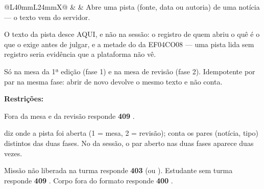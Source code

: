 \begin{tabularx}{\linewidth}{@{}L{40mm}L{24mm}X@{}}
 &  & Abre uma pista (fonte, data ou autoria) de uma notícia --- o texto vem do servidor.\par O texto da pista desce AQUI, e não na sessão: o registro de quem abriu o quê é o que o  exige antes de julgar, e a metade do  da EF04CO08 --- uma pista lida sem registro seria evidência que a plataforma não vê.\par Só na mesa da 1ª edição (fase 1) e na mesa de revisão (fase 2). Idempotente por par na mesma fase: abrir de novo devolve o mesmo texto e não conta.\par \textbf{Restrições:}\par \hspace*{1em}\textbullet{} Fora da mesa e da revisão responde \textbf{409} .\par \hspace*{1em}\textbullet{}  diz onde a pista foi aberta (1 = mesa, 2 = revisão);  conta os pares (notícia, tipo) distintos das duas fases. No  da sessão, o par aberto nas duas fases aparece duas vezes.\par \hspace*{1em}\textbullet{} Missão não liberada na turma responde \textbf{403}  (ou ). Estudante sem turma responde \textbf{409} . Corpo fora do formato responde \textbf{400} .\\

\end{tabularx}
